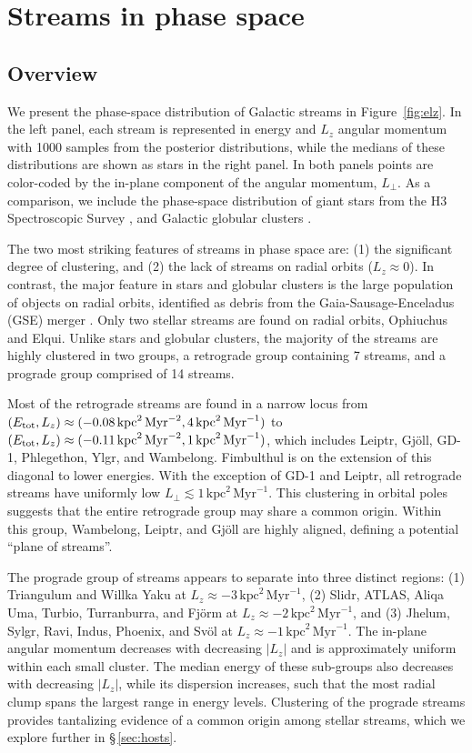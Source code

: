 \documentclass[twocolumn]{aastex63}
\newcommand{\ul}{\ensuremath{\textrm{kpc}^2\,\textrm{Myr}^{-1}}}
\newcommand{\ue}{\ensuremath{\textrm{kpc}^2\,\textrm{Myr}^{-2}}}
\begin{document}
\section{Streams in phase space}
\label{sec:phasespace}

\subsection{Overview}
\label{sec:elz}

We present the phase-space distribution of Galactic streams in Figure~\ref{fig:elz}.
In the left panel, each stream is represented in energy and $L_z$ angular momentum with 1000 samples from the posterior distributions, while the medians of these distributions are shown as stars in the right panel.
In both panels points are color-coded by the in-plane component of the angular momentum, $L_\perp$.
As a comparison, we include the phase-space distribution of giant stars from the H3 Spectroscopic Survey \citep[left panel, small black points;][]{conroy2019}, and Galactic globular clusters \citep[right panel, small circles colored by $L_\perp$;][]{baumgardt2019}.

The two most striking features of streams in phase space are: (1) the significant degree of clustering, and (2) the lack of streams on radial orbits ($L_z\approx0$).
In contrast, the major feature in stars and globular clusters is the large population of objects on radial orbits, identified as debris from the Gaia-Sausage-Enceladus (GSE) merger \citep[e.g.,][]{belokurov2018, helmi2018, naidu2020}.
Only two stellar streams are found on radial orbits, Ophiuchus and Elqui.
Unlike stars and globular clusters, the majority of the streams are highly clustered in two groups, a retrograde group containing 7 streams, and a prograde group comprised of 14 streams.

Most of the retrograde streams are found in a narrow locus from $(E_{\rm tot}, L_z)\approx(-0.08\,\ue,\allowbreak 4\,\ul)$ to $(E_{\rm tot}, L_z)\approx(-0.11\,\ue,\allowbreak 1\,\ul)$, which includes Leiptr, Gj\" oll, GD-1, Phlegethon, Ylgr, and Wambelong.
Fimbulthul is on the extension of this diagonal to lower energies.
With the exception of GD-1 and Leiptr, all retrograde streams have uniformly low $L_\perp\lesssim1\,\ul$.
This clustering in orbital poles suggests that the entire retrograde group may share a common origin.
Within this group, Wambelong, Leiptr, and Gj\" oll are highly aligned, defining a potential ``plane of streams''.

The prograde group of streams appears to separate into three distinct regions: (1) Triangulum and Willka Yaku at $L_z\approx-3\,\ul$, (2) Slidr, ATLAS, Aliqa Uma, Turbio, Turranburra, and Fj\" orm at $L_z\approx-2\,\ul$, and (3) Jhelum, Sylgr, Ravi, Indus, Phoenix, and Sv\" ol at $L_z\approx-1\,\ul$.
The in-plane angular momentum decreases with decreasing $|L_z|$ and is approximately uniform within each small cluster.
The median energy of these sub-groups also decreases with decreasing $|L_z|$, while its dispersion increases, such that the most radial clump spans the largest range in energy levels.
Clustering of the prograde streams  provides tantalizing evidence of a common origin among stellar streams, which we explore further in \S\,\ref{sec:hosts}.
\end{document}

